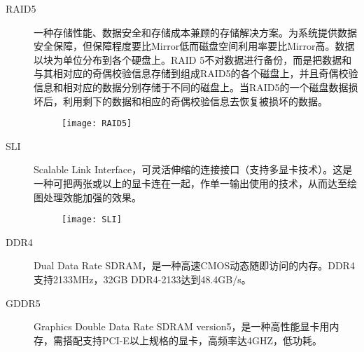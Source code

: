 \begin{description}
\item[RAID5] 一种存储性能、数据安全和存储成本兼顾的存储解决方案。为系统提供数据安全保障，但保障程度要比Mirror低而磁盘空间利用率要比Mirror高。数据以块为单位分布到各个硬盘上。RAID 5不对数据进行备份，而是把数据和与其相对应的奇偶校验信息存储到组成RAID5的各个磁盘上，并且奇偶校验信息和相对应的数据分别存储于不同的磁盘上。当RAID5的一个磁盘数据损坏后，利用剩下的数据和相应的奇偶校验信息去恢复被损坏的数据。
\begin{figure}[!ht]
\centering
\texttt{[image: RAID5]}
\end{figure}

\item[SLI] Scalable Link Interface，可灵活伸缩的连接接口（支持多显卡技术）。这是一种可把两张或以上的显卡连在一起，作单一输出使用的技术，从而达至绘图处理效能加强的效果。
\begin{figure}[!ht]
\centering
\texttt{[image: SLI]}
\end{figure}

\item[DDR4] Dual Data Rate SDRAM，是一种高速CMOS动态随即访问的内存。DDR4支持2133MHz，32GB DDR4-2133达到48.4GB/s。

\item[GDDR5] Graphics Double Data Rate SDRAM version5，是一种高性能显卡用内存，需搭配支持PCI-E以上规格的显卡，高频率达4GHZ，低功耗。


\end{description}
